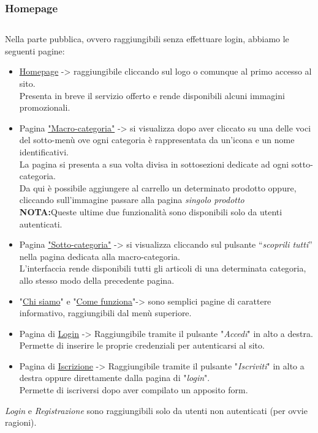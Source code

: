 	\subsubsection{Homepage}
	
\subsection{}
\subsection{}
\subsection{}
Nella parte pubblica, ovvero raggiungibili senza effettuare login, abbiamo le seguenti pagine:
\begin{itemize}
	\item \underline{Homepage} -> raggiungibile cliccando sul logo o comunque al primo accesso al sito.\\ Presenta in breve il servizio offerto e rende disponibili alcuni immagini promozionali.
	\item Pagina \underline{"Macro-categoria"} -> si visualizza dopo aver cliccato su una delle voci del sotto-menù ove ogni categoria è rappresentata da un’icona e un nome identificativi.\\ La pagina si presenta a sua volta divisa in sottosezioni dedicate ad ogni sotto-categoria.\\
	Da qui è possibile aggiungere al carrello un determinato prodotto oppure, cliccando sull'immagine passare alla pagina \textit{singolo prodotto}\\ \textbf{NOTA:}Queste ultime due funzionalità sono disponibili solo da utenti autenticati.
	\item Pagina \underline{"Sotto-categoria"} -> si visualizza cliccando sul pulsante “\textit{scoprili tutti}” nella pagina dedicata alla macro-categoria.\\L’interfaccia rende disponibili tutti gli articoli di una determinata categoria, allo stesso modo della precedente pagina.
	\item "\underline{Chi siamo}"  e "\underline{Come funziona}"-> sono semplici pagine di carattere informativo, raggiungibili dal menù superiore.
	\item Pagina di \underline{Login} -> Raggiungibile tramite il pulsante "\textit{Accedi}" in alto a destra.\\
	Permette di inserire le proprie credenziali per autenticarsi al sito.
	\item Pagina di \underline{Iscrizione} -> Raggiungibile tramite il pulsante "\textit{Iscriviti}" in alto a destra oppure direttamente dalla pagina di "\textit{login}".\\
	Permette di iscriversi dopo aver compilato un apposito form.
\end{itemize}
\textit{Login} e \textit{Registrazione} sono raggiungibili solo da utenti non autenticati (per ovvie ragioni).


